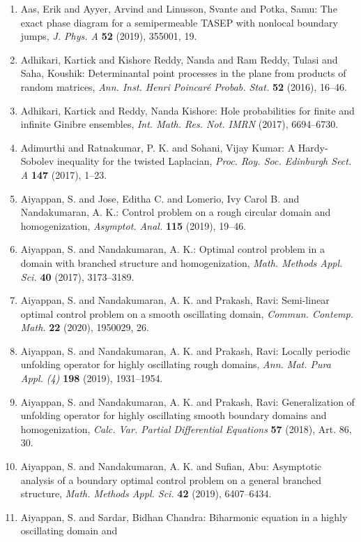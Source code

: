 \begin{enumerate}
\item Aas, Erik and Ayyer, Arvind and Linusson, Svante and Potka,
Samu: The exact phase diagram for a semipermeable {TASEP} with
nonlocal boundary jumps, \emph{J. Phys. A} {\bf 52} (2019), 355001, 19.
\item Adhikari, Kartick and Kishore Reddy, Nanda and Ram Reddy,
Tulasi and Saha, Koushik: Determinantal point processes in the plane from products of
random matrices, \emph{Ann. Inst. Henri Poincar\'{e} Probab. Stat.} {\bf 52} (2016), 16--46.
\item Adhikari, Kartick and Reddy, Nanda Kishore: Hole probabilities for finite and infinite {G}inibre
ensembles, \emph{Int. Math. Res. Not. IMRN} {\bf } (2017), 6694--6730.
\item Adimurthi and Ratnakumar, P. K. and Sohani, Vijay Kumar: A {H}ardy-{S}obolev inequality for the twisted {L}aplacian, \emph{Proc. Roy. Soc. Edinburgh Sect. A} {\bf 147} (2017), 1--23.
\item Aiyappan, S. and Jose, Editha C. and Lomerio, Ivy Carol B. and
Nandakumaran, A. K.: Control problem on a rough circular domain and homogenization, \emph{Asymptot. Anal.} {\bf 115} (2019), 19--46.
\item Aiyappan, S. and Nandakumaran, A. K.: Optimal control problem in a domain with branched structure
and homogenization, \emph{Math. Methods Appl. Sci.} {\bf 40} (2017), 3173--3189.
\item Aiyappan, S. and Nandakumaran, A. K. and Prakash, Ravi: Semi-linear optimal control problem on a smooth oscillating
domain, \emph{Commun. Contemp. Math.} {\bf 22} (2020), 1950029, 26.
\item Aiyappan, S. and Nandakumaran, A. K. and Prakash, Ravi: Locally periodic unfolding operator for highly oscillating
rough domains, \emph{Ann. Mat. Pura Appl. (4)} {\bf 198} (2019), 1931--1954.
\item Aiyappan, S. and Nandakumaran, A. K. and Prakash, Ravi: Generalization of unfolding operator for highly oscillating
smooth boundary domains and homogenization, \emph{Calc. Var. Partial Differential Equations} {\bf 57} (2018), Art. 86, 30.
\item Aiyappan, S. and Nandakumaran, A. K. and Sufian, Abu: Asymptotic analysis of a boundary optimal control problem on a
general branched structure, \emph{Math. Methods Appl. Sci.} {\bf 42} (2019), 6407--6434.
\item Aiyappan, S. and Sardar, Bidhan Chandra: Biharmonic equation in a highly oscillating domain and

\end{enumerate}
